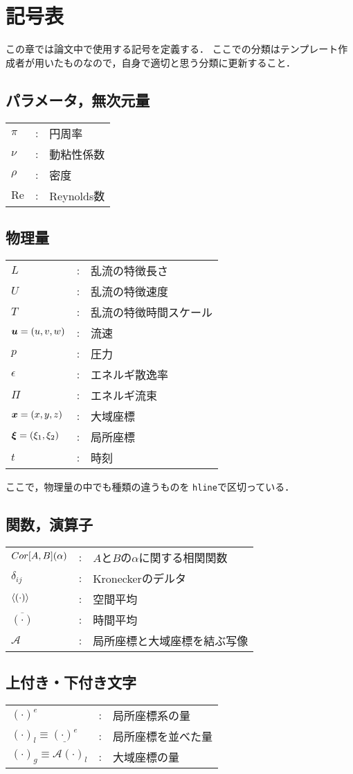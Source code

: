 \chapter*{記号表}

\begin{tcolorbox}
  この章では論文中で使用する記号を定義する．
  ここでの分類はテンプレート作成者が用いたものなので，自身で適切と思う分類に更新すること．
\end{tcolorbox}

\section*{パラメータ，無次元量}
\begin{tabular}{lll}
$\pi$  & : & 円周率 \\
$\nu$  & : & 動粘性係数 \\
$\rho$ & : & 密度 \\
$\mathrm{Re}$ & : & Reynolds数
\end{tabular}

\section*{物理量}
\begin{tabular}{lll}
$L$ & : & 乱流の特徴長さ \\
$U$ & : & 乱流の特徴速度 \\
$T$ & : & 乱流の特徴時間スケール \\ \hline
$\vb*{u}=(u,v,w)$  & : & 流速 \\
$p$ & : & 圧力 \\
$\epsilon$ & : & エネルギ散逸率 \\
$\varPi$ & : & エネルギ流束 \\ \hline
$\vb*{x}=(x,y,z)$ & : & 大域座標 \\
$\vb*{\xi}=(\xi_1,\xi_2)$ & : & 局所座標 \\
$t$ & : & 時刻
\end{tabular}

\begin{tcolorbox}
  ここで，物理量の中でも種類の違うものを \texttt{hline}で区切っている．
\end{tcolorbox}

\section*{関数，演算子}
\begin{tabular}{lll}
$Cor\qty[A,B]\qty(\alpha)$ & : & $A$と$B$の$\alpha$に関する相関関数 \\
$\delta_{ij}$ & : & Kroneckerのデルタ \\
$\expval{(\cdot)}$ & : & 空間平均 \\
$\overline{(\cdot)}$ & : & 時間平均 \\
$\mathcal{A}$ & : & 局所座標と大域座標を結ぶ写像
\end{tabular}

\section*{上付き・下付き文字}
\begin{tabular}{lll}
  $(\cdot)^e$ & : & 局所座標系の量 \\
  $(\cdot)_l \equiv \underline{(\cdot)^e}$ & : & 局所座標を並べた量 \\
  $(\cdot)_g \equiv \mathcal{A} (\cdot)_l$ & : & 大域座標の量 \\
\end{tabular}
